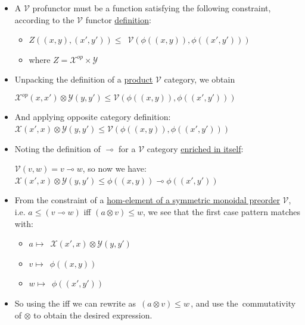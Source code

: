 \begin{itemize}
    \item   A $\mathcal{V}$ profunctor must be a function satisfying the following constraint, according to the $\mathcal{V}$ functor \href{doc/1 math/Seven Sketches in Compositionality/Chapter 2: Resource theories/4 Constructions on V-categories/2 Enriched functors/1 V-functor}{definition}:
      \begin{itemize}
      \item $Z((x,y),(x',y')) \leq$ \,$\mathcal{V}(\phi((x,y)),\phi((x',y')))$\,
      \item where $Z = \mathcal{X}^{op}\times \mathcal{Y}$
      \end{itemize}

      \item Unpacking the definition of a \href{doc/1 math/Seven Sketches in Compositionality/Chapter 2: Resource theories/4 Constructions on V-categories/3 Product V-categories/1 V-category product}{product}  $\mathcal{V}$ category, we obtain

    $\mathcal{X}^{op}(x,x') \otimes \mathcal{Y}(y,y') \leq \mathcal{V}(\phi((x,y)),\phi((x',y')))$

    \item And applying opposite category definition: \,$\mathcal{X}(x',x) \otimes \mathcal{Y}(y,y') \leq \mathcal{V}(\phi((x,y)),\phi((x',y')))$\,

    \item Noting the definition of $\multimap$ for a $\mathcal{V}$ category \href{doc/1 math/Seven Sketches in Compositionality/Chapter 2: Resource theories/5 Computing presented V-categories with matrix mult/1 Monoidal closed preorders/2 Self-enriched category}{enriched in itself}:

    $\mathcal{V}(v,w)=v\multimap w$, so now we have: \,$\mathcal{X}(x',x) \otimes \mathcal{Y}(y,y') \leq \phi((x,y)) \multimap \phi((x',y'))$\,

    \item From the constraint of a \href{doc/1 math/Seven Sketches in Compositionality/Chapter 2: Resource theories/5 Computing presented V-categories with matrix mult/1 Monoidal closed preorders/0 Monoidal closed preorders}{hom-element of a symmetric monoidal preorder} $\mathcal{V}$, i.e. $a \leq (v \multimap w)$ iff $(a \otimes v) \leq w$, we see that the first case pattern matches with:
      \begin{itemize}
      \item $a \mapsto$ \,$\mathcal{X}(x',x) \otimes \mathcal{Y}(y,y')$\,
      \item $v \mapsto$ \,$\phi((x,y))$\,
      \item $w \mapsto$ \,$\phi((x',y'))$\,
      \end{itemize}
    \item So using the iff we can rewrite as \,$(a \otimes v) \leq w$\,, and use the \,commutativity\, of $\otimes$ to obtain the desired expression.
    \end{itemize}
